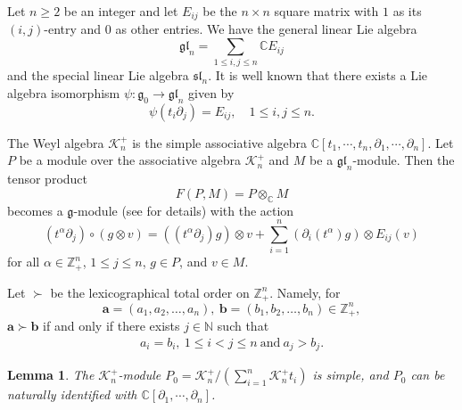 \documentclass[12pt, a4paper]{amsart}
\newcommand{\fg}{\mathfrak g}
\newcommand{\al}{\alpha}
\newcommand{\ptl}{\partial}
\newcommand{\C}{\mathbb{C}}
\newcommand{\N}{\mathbb N}
\newcommand{\Z}{\mathbb Z}
\def\sl{\mathfrak{sl}}
\def\gl{\mathfrak{gl}}
\theoremstyle{Theorem}
\theoremstyle{Theorem}
\newtheorem{lemma}[thm]{Lemma}
\numberwithin{equation}{section}
\begin{document}
Let $n\geq 2$ be an integer and let $E_{ij}$ be the $n\times n$ square matrix with $1$
as its $(i,j)$-entry and $0$ as other entries. We have the general linear Lie algebra
\[\gl_{n}=\sum_{1\leq i,j\leq n}\C E_{ij}\]and the special linear Lie algebra $\sl_{n}$.
It is well known that there exists a Lie algebra isomorphism $\psi:\fg_{0}\rightarrow \gl_{n}$ given by
\[\psi(t_{i}\partial_{j})=E_{ij},\quad 1\leq i,j\leq n.\]

The Weyl algebra $\mathcal{K}_n^+$ is the simple associative algebra
$\C[t_1,\cdots,t_n,\partial_{1},\cdots,\partial_{n}]$.
Let $P$ be a module over the associative algebra $\mathcal{K}_n^+$
and $M$ be a $\gl_n$-module. Then the tensor product
$$F(P, M)=P\otimes_{\C} M$$
becomes a $\fg$-module (see  \cite{LLZ} for details) with the action
\begin{equation}\label{Action1}(t^{\al}\partial_{j})\circ (g\otimes v)=((t^{\alpha}\partial_{j})g)\otimes v+ \sum_{i=1}^n(\ptl_{i}(t^{\alpha})g)\otimes E_{ij}(v)\end{equation}
for all $\alpha\in \Z_{+}^n$, $1\leq j\leq n$, $g\in P$, and $v\in M$.


Let $\succ$ be the lexicographical total order on $\Z_{+}^{n}$. Namely,
for \[\bm{a}=(a_1,a_2,\dots,a_{n}),\ \bm{b}=(b_1,b_2,\dots,b_{n})\in\Z_{+}^{n},\]
$\bm{a}\succ\bm{b}$ if and only if there exists $j\in\N$ such that
\begin{eqnarray}\label{total-order}a_{i}=b_{i},\ 1\leq i<j\leq n\ \text{and}\ a_j>b_j.\end{eqnarray}

\begin{lemma}
	The $\mathcal{K}_n^+$-module
	$P_0=\mathcal{K}_n^+/(\sum\limits_{i=1}^{n}\mathcal{K}_n^+t_i)$ is simple, and
	$P_0$ can be naturally identified with $\C[\partial_1,\cdots,\partial_n]$.
\end{lemma}
\end{document}

